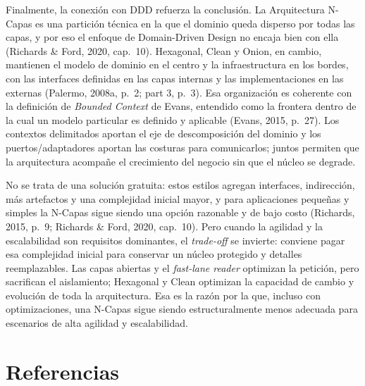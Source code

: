 \documentclass[12pt,a4paper]{article}
\begin{document}
Finalmente, la conexión con DDD refuerza la conclusión. La Arquitectura N-Capas es una partición técnica en la que el dominio queda disperso por todas las capas, y por eso el enfoque de Domain-Driven Design no encaja bien con ella (Richards \& Ford, 2020, cap.~10). Hexagonal, Clean y Onion, en cambio, mantienen el modelo de dominio en el centro y la infraestructura en los bordes, con las interfaces definidas en las capas internas y las implementaciones en las externas (Palermo, 2008a, p.~2; part 3, p.~3). Esa organización es coherente con la definición de \emph{Bounded Context} de Evans, entendido como la frontera dentro de la cual un modelo particular es definido y aplicable (Evans, 2015, p.~27). Los contextos delimitados aportan el eje de descomposición del dominio y los puertos/adaptadores aportan las costuras para comunicarlos; juntos permiten que la arquitectura acompañe el crecimiento del negocio sin que el núcleo se degrade.

No se trata de una solución gratuita: estos estilos agregan interfaces, indirección, más artefactos y una complejidad inicial mayor, y para aplicaciones pequeñas y simples la N-Capas sigue siendo una opción razonable y de bajo costo (Richards, 2015, p.~9; Richards \& Ford, 2020, cap.~10). Pero cuando la agilidad y la escalabilidad son requisitos dominantes, el \emph{trade-off} se invierte: conviene pagar esa complejidad inicial para conservar un núcleo protegido y detalles reemplazables. Las capas abiertas y el \emph{fast-lane reader} optimizan la petición, pero sacrifican el aislamiento; Hexagonal y Clean optimizan la capacidad de cambio y evolución de toda la arquitectura. Esa es la razón por la que, incluso con optimizaciones, una N-Capas sigue siendo estructuralmente menos adecuada para escenarios de alta agilidad y escalabilidad.

\section*{Referencias}
\end{document}
